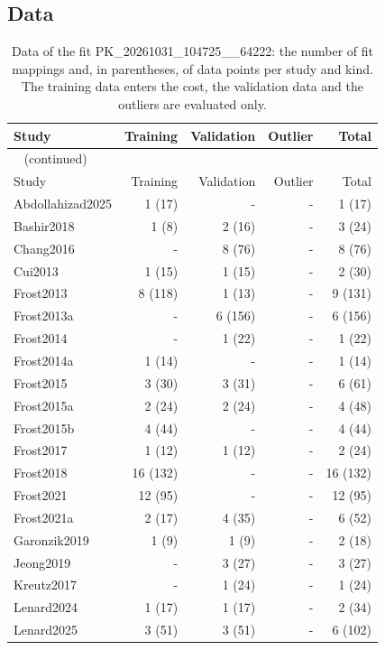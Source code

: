 \documentclass{article}
\begin{document}
\subsection{Data}

\begin{longtable}{lrrrr}
\caption{Data of the fit PK\_20261031\_104725\_\_64222: the number of fit mappings and, in parentheses, of data points per study and kind. The training data enters the cost, the validation data and the outliers are evaluated only.}\label{tab:data:PK_20261031_104725__64222} \\
\toprule
Study & Training & Validation & Outlier & Total \\
\midrule
\endfirsthead
\multicolumn{5}{l}{\small\tablename~\thetable{} (continued)} \\
\toprule
Study & Training & Validation & Outlier & Total \\
\midrule
\endhead
\bottomrule
\endlastfoot
Abdollahizad2025 & 1 (17) & - & - & 1 (17) \\
Bashir2018 & 1 (8) & 2 (16) & - & 3 (24) \\
Chang2016 & - & 8 (76) & - & 8 (76) \\
Cui2013 & 1 (15) & 1 (15) & - & 2 (30) \\
Frost2013 & 8 (118) & 1 (13) & - & 9 (131) \\
Frost2013a & - & 6 (156) & - & 6 (156) \\
Frost2014 & - & 1 (22) & - & 1 (22) \\
Frost2014a & 1 (14) & - & - & 1 (14) \\
Frost2015 & 3 (30) & 3 (31) & - & 6 (61) \\
Frost2015a & 2 (24) & 2 (24) & - & 4 (48) \\
Frost2015b & 4 (44) & - & - & 4 (44) \\
Frost2017 & 1 (12) & 1 (12) & - & 2 (24) \\
Frost2018 & 16 (132) & - & - & 16 (132) \\
Frost2021 & 12 (95) & - & - & 12 (95) \\
Frost2021a & 2 (17) & 4 (35) & - & 6 (52) \\
Garonzik2019 & 1 (9) & 1 (9) & - & 2 (18) \\
Jeong2019 & - & 3 (27) & - & 3 (27) \\
Kreutz2017 & - & 1 (24) & - & 1 (24) \\
Lenard2024 & 1 (17) & 1 (17) & - & 2 (34) \\
Lenard2025 & 3 (51) & 3 (51) & - & 6 (102) \\

\end{longtable}
\end{document}
